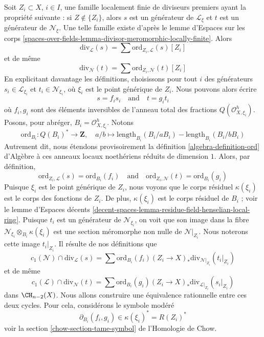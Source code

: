 \medskip\noindent
Soit $Z_i \subset X$, $i \in I$, une famille localement finie de diviseurs
premiers ayant la propriété suivante : si $Z \not \in \{Z_i\}$, alors $s$ est
un générateur de $\mathcal{L}_\xi$ et $t$ est un générateur de
$\mathcal{N}_\xi$. Une telle famille existe d'après le lemme d'Espaces sur les corps
\ref{spaces-over-fields-lemma-divisor-meromorphic-locally-finite}. Alors
$$
\text{div}_\mathcal{L}(s) = \sum \text{ord}_{Z_i, \mathcal{L}}(s) [Z_i]
$$
et de même
$$
\text{div}_\mathcal{N}(t) = \sum \text{ord}_{Z_i, \mathcal{N}}(t) [Z_i]
$$
En explicitant davantage les définitions, choisissons pour tout $i$ des générateurs
$s_i \in \mathcal{L}_{\xi_i}$ et $t_i \in \mathcal{N}_{\xi_i}$,
où $\xi_i$ est le point générique de $Z_i$. Nous pouvons alors écrire
$$
s = f_i s_i
\quad\text{and}\quad
t = g_i t_i
$$
où $f_i, g_i$ sont des éléments inversibles de l'anneau total des fractions
$Q(\mathcal{O}_{X, \xi_i}^h)$. Posons, pour abréger, $B_i = \mathcal{O}_{X,
\xi_i}^h$. Notons
$$
\text{ord}_{B_i} : Q(B_i)^* \longrightarrow \mathbf{Z},\quad
a/b \longmapsto
\text{length}_{B_i}(B_i/aB_i) - \text{length}_{B_i}(B_i/bB_i)
$$
Autrement dit, nous étendons provisoirement la définition
\ref{algebra-definition-ord} d'Algèbre à ces anneaux locaux noethériens réduits
de dimension $1$. Alors, par définition,
$$
\text{ord}_{Z_i, \mathcal{L}}(s) = \text{ord}_{B_i}(f_i)
\quad\text{and}\quad
\text{ord}_{Z_i, \mathcal{N}}(t) = \text{ord}_{B_i}(g_i)
$$
Puisque $\xi_i$ est le point générique de $Z_i$, nous voyons que le corps
résiduel $\kappa(\xi_i)$ est le corps des fonctions de $Z_i$. De plus,
$\kappa(\xi_i)$ est le corps résiduel de $B_i$ ; voir le lemme d'Espaces décents
\ref{decent-spaces-lemma-residue-field-henselian-local-ring}. Puisque $t_i$
est un générateur de $\mathcal{N}_{\xi_i}$, on voit que son image dans la fibre
$\mathcal{N}_{\xi_i} \otimes_{B_i} \kappa(\xi_i)$ est une section méromorphe
non nulle de $\mathcal{N}|_{Z_i}$. Nous noterons cette image $t_i|_{Z_i}$. Il
résulte de nos définitions que
$$
c_1(\mathcal{N}) \cap \text{div}_\mathcal{L}(s) =
\sum \text{ord}_{B_i}(f_i)
(Z_i \to X)_*\text{div}_{\mathcal{N}|_{Z_i}}(t_i|_{Z_i})
$$
et de même
$$
c_1(\mathcal{L}) \cap \text{div}_\mathcal{N}(t) =
\sum \text{ord}_{B_i}(g_i)
(Z_i \to X)_*\text{div}_{\mathcal{L}|_{Z_i}}(s_i|_{Z_i})
$$
dans $\CH_{n - 2}(X)$. Nous allons construire une équivalence rationnelle entre
ces deux cycles. Pour cela, considérons le symbole modéré
$$
\partial_{B_i}(f_i, g_i) \in \kappa(\xi_i)^* = R(Z_i)^*
$$
voir la section \ref{chow-section-tame-symbol} de l'Homologie de Chow.

